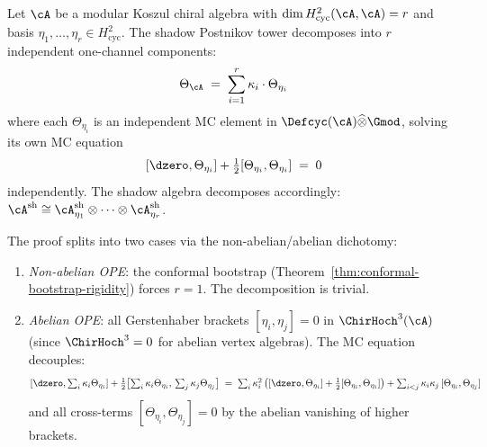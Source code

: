 \begin{theorem}
\label{thm:shadow-channel-decomposition}
Let $\cA$ be a modular Koszul chiral algebra with
$\dim H^2_{\mathrm{cyc}}(\cA, \cA) = r$ and basis
$\eta_1, \ldots, \eta_r \in H^2_{\mathrm{cyc}}$.
The shadow Postnikov tower decomposes into $r$ independent
one-channel components:
\begin{equation}\label{eq:shadow-channel-decomposition}
\Theta_{\cA}
\;=\; \sum_{i=1}^r \kappa_i \cdot \Theta_{\eta_i}
\end{equation}
where each $\Theta_{\eta_i}$ is an independent MC element in
$\Defcyc(\cA) \widehat\otimes \Gmod$, solving its own MC equation
\begin{equation}\label{eq:per-channel-mc}
[\dzero, \Theta_{\eta_i}]
+ \tfrac{1}{2}[\Theta_{\eta_i}, \Theta_{\eta_i}]
\;=\; 0
\end{equation}
independently.  The shadow algebra decomposes accordingly:
$\cA^{\mathrm{sh}} \cong
\cA^{\mathrm{sh}}_{\eta_1} \otimes \cdots
\otimes \cA^{\mathrm{sh}}_{\eta_r}$.

The proof splits into two cases via the non-abelian/abelian
dichotomy:
\begin{enumerate}[label=\textup{(\alph*)}]
\item \emph{Non-abelian OPE}: the conformal bootstrap
  \textup{(}Theorem~\textup{\ref{thm:conformal-bootstrap-rigidity}}\textup{)}
  forces $r = 1$.  The decomposition is trivial.
\item \emph{Abelian OPE}: all Gerstenhaber brackets
  $[\eta_i, \eta_j] = 0$ in $\ChirHoch^3(\cA)$
  \textup{(}since $\ChirHoch^3 = 0$ for abelian vertex
  algebras\textup{)}.  The MC equation decouples:
  \[
  [\dzero, \textstyle\sum_i \kappa_i \Theta_{\eta_i}]
  + \tfrac{1}{2}\bigl[\textstyle\sum_i \kappa_i \Theta_{\eta_i},\,
    \textstyle\sum_j \kappa_j \Theta_{\eta_j}\bigr]
  \;=\; \sum_i \kappa_i^2\,
  \bigl([\dzero, \Theta_{\eta_i}]
  + \tfrac{1}{2}[\Theta_{\eta_i}, \Theta_{\eta_i}]\bigr)
  + \sum_{i < j} \kappa_i \kappa_j\,
  [\Theta_{\eta_i}, \Theta_{\eta_j}]
  \]
  and all cross-terms $[\Theta_{\eta_i}, \Theta_{\eta_j}] = 0$
  by the abelian vanishing of higher brackets.
\end{enumerate}
\end{theorem}

